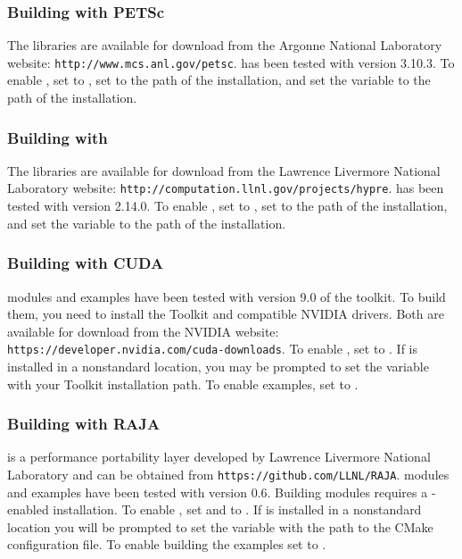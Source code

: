 \subsubsection*{Building with PETSc}
The {\petsc} libraries are available for download from the Argonne National Laboratory website:
{\tt http://www.mcs.anl.gov/petsc}.
{\sundials} has been tested with {\petsc} version 3.10.3.
To enable {\petsc}, set   to , set 
to the  path of the {\petsc} installation, and set the variable
 to the  path of the {\petsc} installation.


\subsubsection*{Building with {\hypre}}
The {\hypre} libraries are available for download from the Lawrence Livermore
National Laboratory website: {\tt http://computation.llnl.gov/projects/hypre}.
{\sundials} has been tested with {\hypre} version 2.14.0.
To enable {\hypre}, set   to , set 
to the  path of the {\hypre} installation, and set the variable
 to the  path of the {\hypre} installation.

\subsubsection*{Building with CUDA}
{\sundials} {\cuda} modules and examples have been tested with version 9.0 of the
{\cuda} toolkit. To build them, you need to install the Toolkit and compatible
NVIDIA drivers. Both are available for download from the NVIDIA website:
{\tt https://developer.nvidia.com/cuda-downloads}. To enable {\cuda},
set  to . If {\cuda} is installed in a
nonstandard location, you may be prompted to set the variable
 with your {\cuda} Toolkit installation
path. To enable {\cuda} examples, set  to .

\subsubsection*{Building with RAJA}
{\raja} is a performance portability layer developed by Lawrence
Livermore National Laboratory and can be obtained from {\tt https://github.com/LLNL/RAJA}.
{\sundials} {\raja} modules and examples have been tested with {\raja}
version 0.6. Building {\sundials} {\raja} modules requires a
{\cuda}-enabled {\raja} installation. To enable {\raja}, set
 and  to . If {\raja} is
installed in a nonstandard location you will be prompted to set the
variable  with the path to the {\raja} CMake
configuration file. To enable building the {\raja} examples set
 to .

